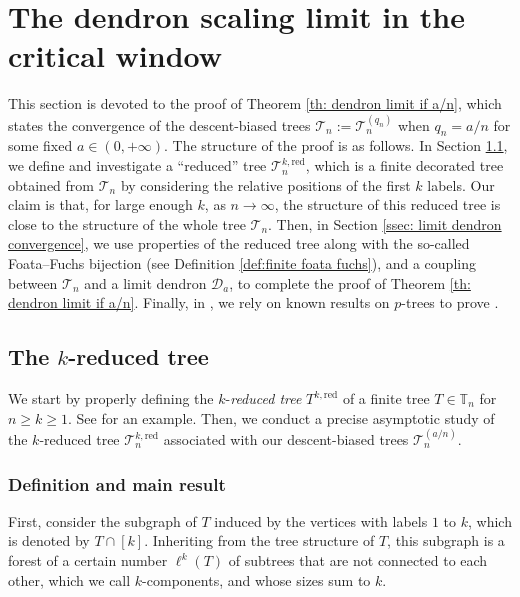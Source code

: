 \documentclass{article}
\theoremstyle{remark}
\newcommand{\bT}{\mathbb{T}}
\newcommand{\cT}{\mathcal{T}}
\newcommand{\cD}{\mathcal{D}}
\newcommand{\red}{\mathrm{red}}
\begin{document}
\section{The dendron scaling limit in the critical window}
\label{sec:dendron limit}

This section is devoted to the proof of Theorem \ref{th: dendron limit if a/n}, which states the convergence of the descent-biased trees $\cT_n := \cT_n^{(q_n)}$ when $q_n = a/n$ for some fixed $a \in (0,+\infty)$. 
The structure of the proof is as follows. 
In Section \ref{ssec:reduced tree}, we define and investigate a ``reduced'' tree $\cT_n^{k,\red}$, which is a finite decorated tree obtained from $\cT_n$ by considering the relative positions of the first $k$ labels. 
Our claim is that, for large enough $k$, as $n \rightarrow \infty$, the structure of this reduced tree is close to the structure of the whole tree $\cT_n$. 
Then, in Section \ref{ssec: limit dendron convergence}, we use properties of the reduced tree along with the so-called Foata--Fuchs bijection (see Definition \ref{def:finite foata fuchs}), and a coupling between $\cT_n$ and a limit dendron $\cD_a$, to complete the proof of Theorem \ref{th: dendron limit if a/n}.
Finally, in , we rely on known results on $p$-trees to prove . 


\subsection{The $k$-reduced tree}
\label{ssec:reduced tree}

We start by properly defining the $k$-\textit{reduced tree} $T^{k,\red}$ of a finite tree $T \in \bT_n$ for $n \geq k \geq 1$. 
See  for an example.
Then, we conduct a precise asymptotic study of the $k$-reduced tree $\cT_n^{k,\red}$ associated with our descent-biased trees $\cT_n^{(a/n)}$.

\subsubsection{Definition and main result}

First, consider the subgraph of $T$ induced by the vertices with labels $1$ to $k$, which is denoted by $T\cap[k]$.
Inheriting from the tree structure of $T$, this subgraph is a forest of a certain number $\ell^{k}(T)$ of subtrees that are not connected to each other, which we call $k$-components, and whose sizes sum to $k$.
\end{document}
